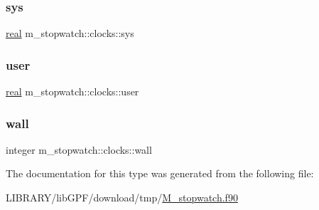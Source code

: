 \subsubsection{\texorpdfstring{sys}{sys}}
{\footnotesize\ttfamily \hyperlink{read__watch_83_8txt_abdb62bde002f38ef75f810d3a905a823}{real} m\+\_\+stopwatch\+::clocks\+::sys\hspace{0.3cm}{\ttfamily [private]}}

\mbox{\label{structm__stopwatch_1_1clocks_a6734a01073d44a271b14f6c7e266fa61}} 
\subsubsection{\texorpdfstring{user}{user}}
{\footnotesize\ttfamily \hyperlink{read__watch_83_8txt_abdb62bde002f38ef75f810d3a905a823}{real} m\+\_\+stopwatch\+::clocks\+::user\hspace{0.3cm}{\ttfamily [private]}}

\mbox{\label{structm__stopwatch_1_1clocks_a8c979e58959961744ee85e5f44fbaf64}} 
\subsubsection{\texorpdfstring{wall}{wall}}
{\footnotesize\ttfamily integer m\+\_\+stopwatch\+::clocks\+::wall\hspace{0.3cm}{\ttfamily [private]}}



The documentation for this type was generated from the following file\+:\begin{DoxyCompactItemize}
\item 
L\+I\+B\+R\+A\+R\+Y/lib\+G\+P\+F/download/tmp/\hyperlink{M__stopwatch_8f90}{M\+\_\+stopwatch.\+f90}\end{DoxyCompactItemize}
